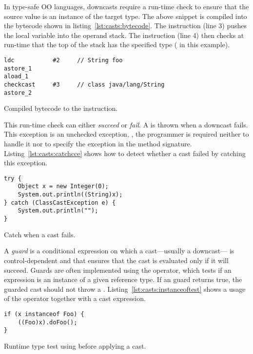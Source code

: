 In type-safe OO languages, downcasts require
a run-time check to ensure that the source value is an instance of the target type.
The above snippet is compiled into the \java{} bytecode shown in listing~\ref{lst:casts:bytecode}.
The  instruction (line 3) pushes the local variable  into the operand stack.
The  instruction (line 4) then checks at run-time that the top of the stack has the specified type ( in this example).

\begin{listing}
\begin{verbatim}	
ldc           #2     // String foo
astore_1
aload_1
checkcast     #3     // class java/lang/String
astore_2
\end{verbatim}	
\caption{Compiled bytecode to the  instruction.}
\label{lst:casts:bytecode}
\end{listing}

This run-time check can either \emph{succeed} or \emph{fail}.
A  is thrown when a downcast fails.
This exception is an unchecked exception, \ie,
the programmer is required neither to handle it
nor to specify the exception in the method signature.
Listing~\ref{lst:casts:catchcce} shows how to detect whether a cast failed by catching this exception.

\begin{listing}
\begin{verbatim}	
try {
	Object x = new Integer(0);
	System.out.println((String)x); 
} catch (ClassCastException e) { 
	System.out.println(""); 
}
\end{verbatim}
\caption{Catch  when a cast fails.}
\label{lst:casts:catchcce}
\end{listing}

A \emph{guard} is a conditional expression on which a cast---usually a downcast--- is control-dependent and that ensures that the cast is evaluated only if it will succeed.
Guards are often implemented using the  operator, which tests
if an expression is an instance of a given reference type.
If an  guard returns true, the guarded cast should not throw
a .
Listing~\ref{lst:casts:instanceoftest} shows a usage of the  operator together with a cast expression.

\begin{listing}
\begin{verbatim}
if (x instanceof Foo) {
	((Foo)x).doFoo();
}
\end{verbatim}
\caption{Runtime type test using  before applying a cast.}
\label{lst:casts:instanceoftest}
\end{listing}

